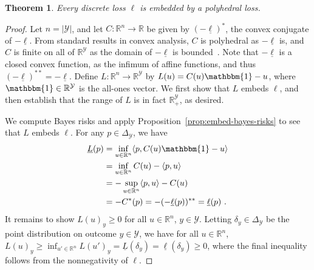 \documentclass[12pt]{article}
\newcommand{\Comments}{1}
\newcommand{\mytodo}[2]{\ifnum\Comments=1%
  \todo[linecolor=#1!80!black,backgroundcolor=#1,bordercolor=#1!80!black]{#2}\fi}
\newcommand{\btw}[1]{}%
\newcommand{\reals}{\mathbb{R}}
\newcommand{\simplex}{\Delta_\Y}
\newcommand{\Y}{\mathcal{Y}}
\newcommand{\risk}[1]{\underline{#1}}
\newcommand{\inprod}[2]{\langle #1, #2 \rangle}%
\newcommand{\ones}{\mathbbm{1}}
\newtheorem{theorem}{Theorem}
\begin{document}
\begin{theorem}\label{thm:discrete-loss-poly-embeddable}
  Every discrete loss $\ell$ is embedded by a polyhedral loss.
\end{theorem}
\begin{proof}
  Let $n = |\Y|$, and let $C:\reals^n \to \reals$ be given by $(-\risk{\ell})^*$, the convex conjugate of $-\risk{\ell}$.
  From standard results in convex analysis, $C$ is polyhedral as $-\risk{\ell}$ is, and $C$ is finite on all of $\reals^\Y$ as the domain of $-\risk{\ell}$ is bounded~\cite[Corollary 13.3.1]{rockafellar1997convex}.
  Note that $-\risk{\ell}$ is a closed convex function, as the infimum of affine functions, and thus $(-\risk{\ell})^{**} = -\risk{\ell}$.
  Define $L:\reals^n\to\reals^\Y$ by $L(u) = C(u)\ones - u$, where $\ones\in\reals^\Y$ is the all-ones vector.
  We first show that $L$ embeds $\ell$, and then establish that the range of $L$ is in fact $\reals^\Y_+$, as desired.

  We compute Bayes risks and apply Proposition~\ref{prop:embed-bayes-risks} to see that $L$ embeds $\ell$.
  For any $p\in\simplex$, we have
  \begin{align*}
    \risk{L}(p)
    &= \inf_{u\in\reals^n} \inprod{p}{C(u)\ones - u}\\
    &= \inf_{u\in\reals^n} C(u) - \inprod{p}{u}\\
    &= -\sup_{u\in\reals^n} \inprod{p}{u} - C(u)\\
    &= -C^*(p) = - (-\risk{\ell}(p))^{**} = \risk{\ell}(p)~.
  \end{align*}
  It remains to show $L(u)_y \geq 0$ for all $u\in\reals^n$, $y\in\Y$.
  Letting $\delta_y\in\simplex$ be the point distribution on outcome $y\in\Y$, we have for all $u\in\reals^n$, $L(u)_y \geq \inf_{u'\in\reals^n} L(u')_y = \risk{L}(\delta_y) = \risk{\ell}(\delta_y) \geq 0$, where the final inequality follows from the nonnegativity of $\ell$.
  \btw{FUTURE: to get $n-1$, just use the same trick as before and note that the Bayes risk doesn't change.  Should be a couple lines.  (Not needed for NeurIPS since we don't focus on the dimension.)}
\end{proof}

\btw{Cut summary for now (Why is this cool?)}
\end{document}
